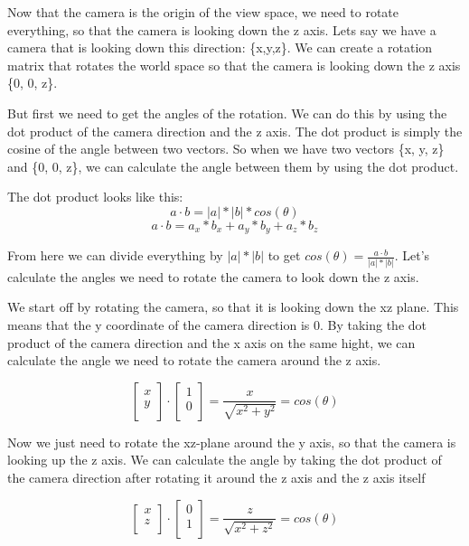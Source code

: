 \documentclass[12pt]{report} \usepackage{preamble}
\begin{document}
Now that the camera is the origin of the view space, we need to rotate everything,
so that the camera is looking down the z axis. Lets say we have a camera that
is looking down this direction: \{x,y,z\}. We can create a rotation matrix that
rotates the world space so that the camera is looking down the z axis \{0, 0, z\}.

But first we need to get the angles of the rotation. We can do this by using the
dot product of the camera direction and the z axis. The dot product is simply the
cosine of the angle between two vectors. So when we have two vectors \{x, y, z\}
and \{0, 0, z\}, we can calculate the angle between them by using the dot product.

The dot product looks like this:
\[a \cdot b = |a| * |b| * cos(\theta)\]
\[a \cdot b = a_x * b_x + a_y * b_y + a_z * b_z\]

From here we can divide everything by \(|a| * |b|\) to get \(cos(\theta)= \frac{a \cdot b}{|a| * |b|}\).
Let's calculate the angles we need to rotate the camera to look down the z axis.

We start off by rotating the camera, so that it is looking down the xz plane.
This means that the y coordinate of the camera direction is 0. By taking the dot
product of the camera direction and the x axis on the same hight, we can calculate the angle
we need to rotate the camera around the z axis.

\[
	\begin{bmatrix}
		x \\
		y \\
	\end{bmatrix}
	\cdot
	\begin{bmatrix}
		1 \\
		0 \\
	\end{bmatrix}
	=
	\frac{x}{\sqrt{x^2 + y^2}}
	=
	cos(\theta)
\]

Now we just need to rotate the xz-plane around the y axis, so that the camera is looking
up the z axis. We can calculate the angle by taking the dot product of the camera direction
after rotating it around the z axis and the z axis itself

\[
	\begin{bmatrix}
		x \\
		z \\
	\end{bmatrix}
	\cdot
	\begin{bmatrix}
		0 \\
		1 \\
	\end{bmatrix}
	=
	\frac{z}{\sqrt{x^2 + z^2}}
	=
	cos(\theta)
\]
\end{document}
